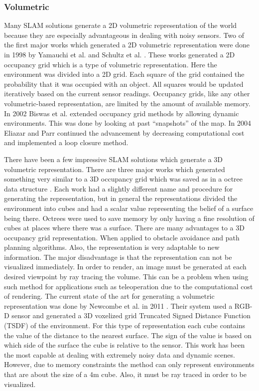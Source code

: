 \documentclass[12pt]{article}
\begin{document}
\subsubsection{Volumetric}

Many SLAM solutions generate a 2D volumetric representation of the world
because they are especially advantageous in dealing with noisy sensors. Two
of the first major works which generated a 2D volumetric representation
were done in 1998 by Yamauchi et al. \cite{Yamauchi1998} and Schultz et al.
\cite{Schultz1998}. These works generated a 2D occupancy grid which is a
type of volumetric representation. Here the environment was divided into a
2D grid.  Each square of the grid contained the probability that it was
occupied with an object. All squares would be updated iteratively based on
the current sensor readings. Occupancy grids, like any other
volumetric-based representation, are limited by the amount of available
memory. In 2002 Biswas et al. \cite{Biswas2002} extended occupancy grid
methods by allowing dynamic environments. This was done by looking at past
``snapshots'' of the map. In 2004 Eliazar and Parr \cite{Eliazar2004}
continued the advancement by decreasing computational cost and implemented
a loop closure method.

There have been a few impressive SLAM solutions which generate a 3D
volumetric representation. There are three major works which generated
something very similar to a 3D occupancy grid which was saved as in a
octree data structure
\cite{Magnusson2007,Nuchter2007,Huang2011,Endres2012}. Each work had a
slightly different name and procedure for generating the representation,
but in general the representations divided the environment into cubes and
had a scalar value representing the belief of a surface being there.
Octrees were used to save memory by only having a fine resolution of cubes
at places where there was a surface. There are many advantages to a 3D
occupancy grid representation. When applied to obstacle avoidance and path
planning algorithms. Also, the representation is very adaptable to new
information. The major disadvantage is that the representation can not be
visualized immediately. In order to render, an image must be generated at
each desired viewpoint by ray tracing the volume. This can be a problem
when using such method for applications such as teleoperation due to the
computational cost of rendering. The current state of the art for
generating a volumetric representation was done by Newcombe et al.  in 2011
\cite{Newcombe2011a}.  Their system used a RGB-D sensor and generated a 3D
voxelized grid Truncated Signed Distance Function (TSDF) of the
environment. For this type of representation each cube contains the value
of the distance to the nearest surface. The sign of the value is based on
which side of the surface the cube is relative to the sensor. This work has
been the most capable at dealing with extremely noisy data and dynamic
scenes. However, due to memory constraints the method can only represent
environments that are about the size of a 4m cube. Also, it must be ray
traced in order to be visualized.   
\end{document}
